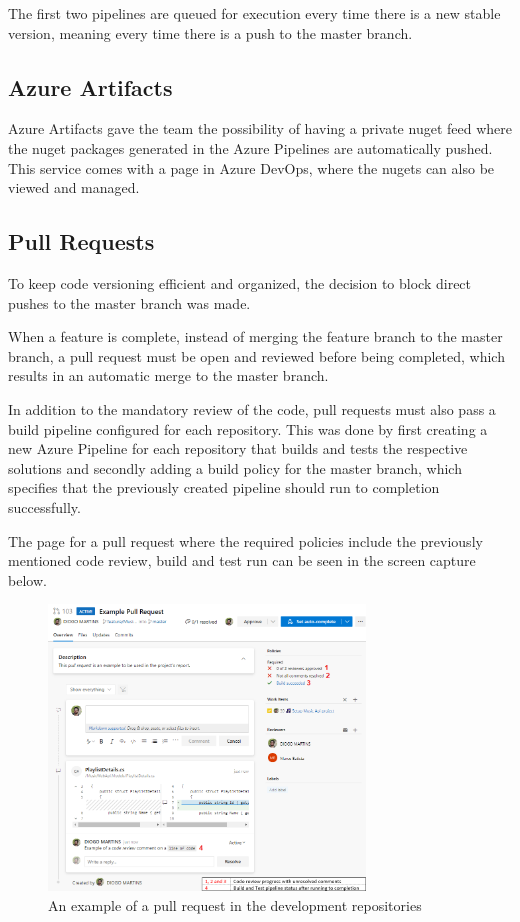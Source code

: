 The first two pipelines are queued for execution every time there is a new stable version, meaning every time there is a push to the master branch.

\subsection{Azure Artifacts}
Azure Artifacts gave the team the possibility of having a private nuget feed where the nuget packages generated in the Azure Pipelines are automatically pushed. This service comes with a page in Azure DevOps, where the nugets can also be viewed and managed.

\subsection{Pull Requests}

To keep code versioning efficient and organized, the decision to block direct pushes to the master branch was made.

When a feature is complete, instead of merging the feature branch to the master branch, a pull request must be open and reviewed before being completed, which results in an automatic merge to the master branch.

In addition to the mandatory review of the code, pull requests must also pass a build pipeline configured for each repository. This was done by first creating a new Azure Pipeline for each repository that builds and tests the respective solutions and secondly adding a build policy for the master branch, which specifies that the previously created pipeline should run to completion successfully.

The page for a pull request where the required policies include the previously mentioned code review, build and test run can be seen in the screen capture below.

\begin{figure}[!ht]
	\centering
	\includegraphics[width=0.75\textwidth]{./Chapter4/Figures/PullRequestExample.png}
	\caption{An example of a pull request in the development repositories}
	\label{fig:PullRequestExample}
\end{figure}

